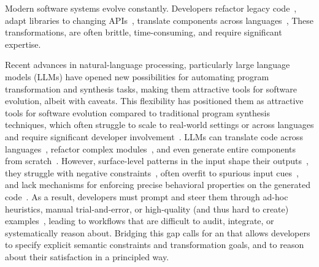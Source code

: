 \documentclass[sigplan,review,anonymous,10pt]{acmart}
\begin{document}


Modern software systems evolve constantly.
Developers refactor legacy code~\cite{Fowler99,Mens04,facebook2010redesigns,dropbox2014syncengine},
adapt libraries to changing APIs~\cite{dig2005role,kula2017empiricalstudyimpactrefactoring},
translate components across languages~\cite{manzoor_cli_python,gaultier_rewrite_cpp},
These transformations, are often brittle, time-consuming, and require significant expertise.

Recent advances in natural-language processing, particularly large language
models (LLMs) have opened new possibilities for automating program
transformation and synthesis tasks,
making them attractive tools for software
evolution, albeit with caveats.
This flexibility has positioned them as attractive tools for software evolution
compared to traditional program synthesis techniques, which often struggle
to scale to real-world settings or across languages and require significant developer involvement~\cite{reynolds2019syguscomp,leino2016dafny,wu2023programming,dynamoth2016,cambronero2019active}.
LLMs can translate code across languages~\cite{ou2025enhancingllmbasedcodetranslation},
refactor complex modules~\cite{ziftci2025migrating},
and even generate entire components from scratch~\cite{huynh2025largelanguagemodelscode}.
However, surface-level patterns in the input shape their outputs~\cite{yang2025evaluatinggeneralizationcapabilitieslarge},
they struggle with negative constraints~\cite{hwang2024thinkpinkelephant,jiang2024llmsdreamelephantswhen},
often overfit to spurious input cues~\cite{xu2023llmfoolitselfpromptbased, wu2023deceptpromptexploitingllmdrivencode},
and lack mechanisms for enforcing precise behavioral properties on the generated code~\cite{roh2025breakthechainreasoningfailuresllms}.
As a result, developers must prompt and steer them through ad-hoc heuristics, manual trial-and-error, or high-quality (and thus hard to create) examples~\cite{khattab2023dspy,brown2020languagemodelsfewshotlearners},
leading to workflows that are difficult to audit, integrate, or systematically reason about.
Bridging this gap calls for an that allows developers to specify explicit semantic constraints and transformation goals, and to reason about their satisfaction in a principled way.
\end{document}
